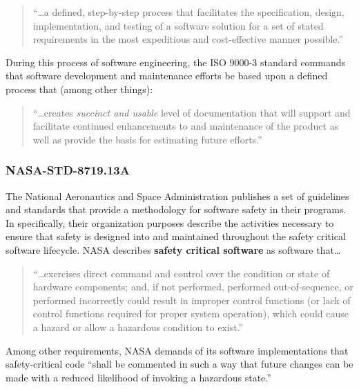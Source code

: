 \begin{quote}
``\ldots a defined, step-by-step process that facilitates the specification,
design, implementation, and testing of a software solution for a set of stated
requirements in the most expeditious and cost-effective manner possible.''
\cite{Kehoe1996}
\end{quote}

During this process of software engineering, the ISO 9000-3 standard commands
that software development and maintenance efforts be based upon a defined
process that (among other things): 

\begin{quote}
``\ldots creates \textit{succinct and usable} level of documentation that will
support and facilitate continued enhancements to and maintenance of the product
as well as provide the basis for estimating future efforts.'' \cite{Kehoe1996}
\end{quote}

\subsubsection{NASA-STD-8719.13A}
The National Aeronautics and Space Administration publishes a set of guidelines
and standards that provide a methodology for software safety in their programs.
In \cite{NASA1997} specifically, their organization purposes describe the
activities necessary to ensure that safety is designed into and maintained
throughout the safety critical software lifecycle. NASA describes \textbf{safety
critical software} as software that\ldots

\begin{quote} 
``\ldots exercises direct command and control over the condition or state of
hardware components; and, if not performed, performed out-of-sequence, or
performed incorrectly could result in improper control functions (or lack of
control functions required for proper system operation), which could cause a
hazard or allow a hazardous condition to exist.'' \cite{NASA1997}
\end{quote}

Among other requirements, NASA demands of its software implementations that
safety-critical code ``shall be commented in such a way that future changes can
be made with a reduced likelihood of invoking a hazardous state.''

